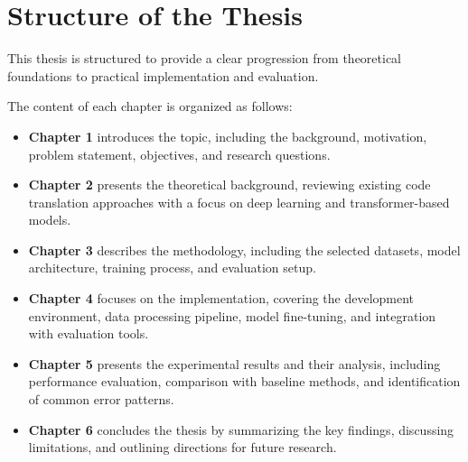 \section{Structure of the Thesis}

This thesis is structured to provide a clear progression from theoretical foundations to practical implementation and evaluation.

The content of each chapter is organized as follows:

\begin{itemize}

    \item \textbf{Chapter 1} introduces the topic, including the background, motivation, problem statement, objectives, and research questions.

    \item \textbf{Chapter 2} presents the theoretical background, reviewing existing code translation approaches with a focus on deep learning and transformer-based models.

    \item \textbf{Chapter 3} describes the methodology, including the selected datasets, model architecture, training process, and evaluation setup.

    \item \textbf{Chapter 4} focuses on the implementation, covering the development environment, data processing pipeline, model fine-tuning, and integration with evaluation tools.

    \item \textbf{Chapter 5} presents the experimental results and their analysis, including performance evaluation, comparison with baseline methods, and identification of common error patterns.

    \item \textbf{Chapter 6} concludes the thesis by summarizing the key findings, discussing limitations, and outlining directions for future research.
\end{itemize}


